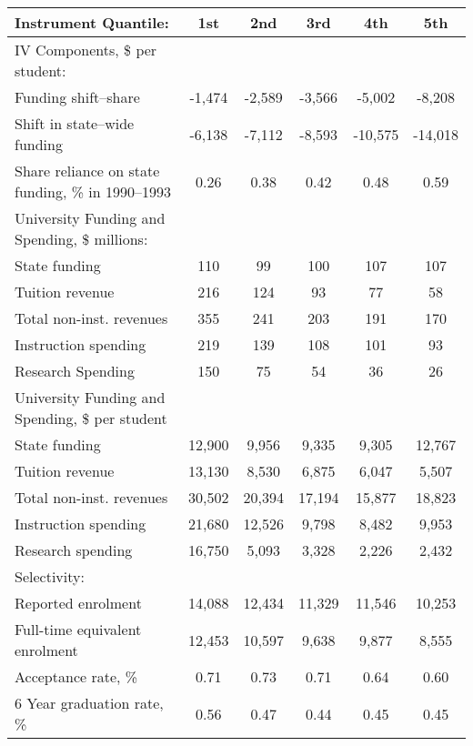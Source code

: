 \begin{tabular}{lccccc}
  \hline
Instrument Quantile: & 1st & 2nd & 3rd & 4th & 5th \\ 
  \hline
IV Components, \$ per student: &  &  &  &  &  \\ 
  Funding shift--share & -1,474 & -2,589 & -3,566 & -5,002 & -8,208 \\ 
  Shift in state--wide funding & -6,138 & -7,112 & -8,593 & -10,575 & -14,018 \\ 
  Share reliance on state funding, \% in 1990--1993 & 0.26 & 0.38 & 0.42 & 0.48 & 0.59 \\ 
  \hline University Funding and Spending, \$ millions: &  &  &  &  &  \\ 
  State funding & 110 & 99 & 100 & 107 & 107 \\ 
  Tuition revenue & 216 & 124 & 93 & 77 & 58 \\ 
  Total non-inst. revenues & 355 & 241 & 203 & 191 & 170 \\ 
  Instruction spending & 219 & 139 & 108 & 101 & 93 \\ 
  Research Spending & 150 & 75 & 54 & 36 & 26 \\ 
  \hline University Funding and Spending, \$ per student &  &  &  &  &  \\ 
  State funding & 12,900 & 9,956 & 9,335 & 9,305 & 12,767 \\ 
  Tuition revenue & 13,130 & 8,530 & 6,875 & 6,047 & 5,507 \\ 
  Total non-inst. revenues & 30,502 & 20,394 & 17,194 & 15,877 & 18,823 \\ 
  Instruction spending & 21,680 & 12,526 & 9,798 & 8,482 & 9,953 \\ 
  Research spending & 16,750 & 5,093 & 3,328 & 2,226 & 2,432 \\ 
  \hline Selectivity: &  &  &  &  &  \\ 
  Reported enrolment & 14,088 & 12,434 & 11,329 & 11,546 & 10,253 \\ 
  Full-time equivalent enrolment & 12,453 & 10,597 & 9,638 & 9,877 & 8,555 \\ 
  Acceptance rate, \% & 0.71 & 0.73 & 0.71 & 0.64 & 0.60 \\ 
  6 Year graduation rate, \% & 0.56 & 0.47 & 0.44 & 0.45 & 0.45 \\ 
   \hline
\end{tabular}
